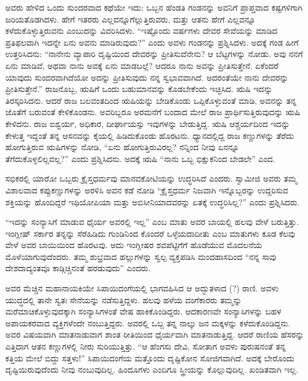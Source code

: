 ಅವರು ಹೇಳಿದ ಒಂದು ಸುಂದರವಾದ ಕಥೆಯೇ ಇದು: ಒಬ್ಬನ ಹೆಂಡತಿ ಗಂಡನನ್ನು ಅವನಿಗೆ ಪ್ರಾಪ್ತವಾದ ಕಷ್ಟಗಳಿಗಾಗಿ ಜರಿಯತೊಡಗಿದಳು. ಹೇಗೆ ಇತರರು ಎಲ್ಲವನ್ನೂ\break ಗೆಲ್ಲುತ್ತಿರುವರು, ಮತ್ತು ಆತನು ಹೇಗೆ ಎಲ್ಲವನ್ನೂ ಕಳೆದುಕೊಳ್ಳುತ್ತಿರುವನು ಎಂಬುದನ್ನು ವಿವರಿಸಿದಳು. “ಇಷ್ಟೊಂದು ವರ್ಷಗಳು ದೇವರ ಸೇವೆಯನ್ನು ಮಾಡಿದ ಪ್ರತಿಫಲವಾಗಿ ಇದನ್ನೇ ಏನು ಅವನು ಮಾಡಿರುವುದು?” ಎಂದು ಅವಳು ಗಂಡನನ್ನು ಪ್ರಶ್ನಿಸಿದಳು. ಅದಕ್ಕೆ ಗಂಡ ಹೀಗೆ ಉತ್ತರಿಸಿದನು: “ನಾನೇನು ವ್ಯಾಪಾರಿ ದೃಷ್ಟಿಯಿಂದ ದೇವರನ್ನು ಪ್ರೀತಿಸುವೆನೇನು? ಆ ಬೆಟ್ಟಗಳನ್ನು ನೋಡು. ಅವು ನನಗೆ ಏನು ಮಾಡಿವೆ, ಅಥವಾ ನಾನು ಅವಕ್ಕೆ ಏನು ಮಾಡಬಲ್ಲೆ? ಆದರೂ ನಾನು ಅವನ್ನು ಪ್ರೀತಿಸುತ್ತೇನೆ. ಏಕೆಂದರೆ ಯಾವುದು ಸುಂದರವಾಗಿದೆಯೋ ಅದನ್ನು ಪ್ರೀತಿಸುವುದು ನನ್ನ ಸ್ವಭಾವವಾಗಿದೆ. ಅದರಂತೆಯೇ ನಾನು ದೇವರನ್ನು ಪ್ರೀತಿಸುತ್ತೇನೆ.” ರಾಜನೊಬ್ಬ, ಋಷಿಗೆ ಒಂದು ಬಹುಮಾನವನ್ನು ಕೊಡಬೇಕೆಂದು ಇಚ್ಛಿಸಿದ. ಋಷಿ ಇದನ್ನು ತಿರಸ್ಕರಿಸಿದನು. ಆದರೆ ರಾಜ ಬಲವಂತದಿಂದ ಋಷಿಯನ್ನು ಬೇಡಿಕೊಂಡು ಒಪ್ಪಿಕೊಳ್ಳುವಂತೆ ಮಾಡಿ, ಅವನನ್ನು ತನ್ನ ಜೊತೆಗೆ ಬರುವಂತೆ ಕೇಳಿಕೊಂಡನು. ಅವರಿಬ್ಬರೂ ಅರಮನೆಗೆ ಬಂದಾದ ಮೇಲೆ ರಾಜ ಪ್ರಾರ್ಥಿಸುತ್ತಿರುವುದನ್ನು ಋಷಿ ಕೇಳಿದನು. ರಾಜ ಐಶ್ವರ್ಯ, ಅಧಿಕಾರ, ದೀರ್ಘಾಯಸ್ಸು ಇವುಗಳನ್ನು ಬೇಡುತ್ತಿದ್ದ. ಋಷಿ ಆಶ್ಚರ್ಯದಿಂದ ಇದನ್ನು ಕೇಳುತ್ತ ಇದ್ದಂತೆ ತನ್ನ ಆಸನವನ್ನು ಕೈಯಲ್ಲಿ ಹಿಡಿದುಕೊಂಡು ಹೊರಟನು. ಧ್ಯಾನದಲ್ಲಿದ್ದ ರಾಜ ಕಣ್ಣುಗಳನ್ನು ತೆರೆದು ಹೋಗುತ್ತಿರುವ ಋಷಿಗಳನ್ನು ನೋಡಿ, “ಏನು ಹೋಗುತ್ತಿರುವಿರಲ್ಲ? ನನ್ನಿಂದ ನೀವು ಏನನ್ನೂ ತೆಗೆದುಕೊಳ್ಳಲಿಲ್ಲವಲ್ಲ?” ಎಂದು ಪ್ರಶ್ನಿಸಿದನು. ಅದಕ್ಕೆ ಋಷಿ “ನಾನು ಒಬ್ಬ ಭಿಕ್ಷುಕನಿಂದ ಬೇಡಲೇ” ಎಂದ.

ಸಭಿಕರಲ್ಲಿ ಯಾರೋ ಒಬ್ಬರು ಕ್ರೈಸ್ತಧರ್ಮವು ಮಾನವಕೋಟಿಯನ್ನು ಉದ್ಧರಿಸಿದೆ ಎಂದರು. ಸ್ವಾಮೀಜಿ ಅವರು ತಮ್ಮ ವಿಶಾಲವಾದ ಕಪ್ಪುಕಣ್ಣುಗಳನ್ನು ಅರಳಿಸಿ ಅವನ ಕಡೆ ನೋಡಿ “ಕ್ರೈಸ್ತಧರ್ಮ ನಿಜವಾಗಿ ಇನ್ನೊಬ್ಬರನ್ನು ಉದ್ದರಿಸುವ ಶಕ್ತಿಯನ್ನು ಹೊಂದಿದ್ದರೆ ಇಥಿಯೋಪಿಯಾ ಮತ್ತು ಅಬಿಸೀನಿಯಾದವರನ್ನು ಏತಕ್ಕೆ ಉದ್ಧರಿಸಿಲ್ಲ?” ಎಂದು ಪ್ರಶ್ನಿಸಿದರು.

“ಇದನ್ನು ಸಂನ್ಯಾಸಿಗೆ ಮಾಡುವ ಧೈರ್ಯ ಅವರಲ್ಲಿ ಇಲ್ಲ” ಎಂಬ ಮಾತು ಅವರ ಬಾಯಲ್ಲಿ ಹಲವು ವೇಳೆ ಬರುತ್ತಿತ್ತು. ಇಂಗ್ಲೀಷ್​ ಸರ್ಕಾರ ತನ್ನನ್ನು ಸೆರೆಹಿಡಿದು ಗುಂಡಿನಿಂದ ಕೊಂದರೆ ಒಳ್ಳೆಯದಾದೀತು ಎಂಬ ಮಾತುಗಳು ಕೂಡ ಕೆಲವು ವೇಳೆ ಅವರ ಬಾಯಿಯಿಂದ ಹೊರಟವು. ಅದು ಇಂಗ್ಲೀಷರ ಶವಪೆಟ್ಟಿಗೆಗೆ ಹೊಡೆಯುವ ಮೊದಲನೆಯ ಮೊಳೆಯಾಗುವುದೆಂದರು. ತಮ್ಮ ಶುಭ್ರವಾದ ಹಲ್ಲುಗಳನ್ನು ಸ್ವಲ್ಪ ವ್ಯಕ್ತಪಡಿಸಿ ಮಂದಹಾಸದಿಂದ “ನನ್ನ ಸಾವು ದೇಶದಾದ್ಯಂತವೂ ಕಾಡ್ಗಿಚ್ಚಿನಂತೆ ಹರಡುವುದು” ಎಂದರು.

ಅವರ ಮೆಚ್ಚಿನ ಮಹಾನಾಯಕಿಯೇ ಸಿಪಾಯಿದಂಗೆಯಲ್ಲಿ ಭಾಗವಹಿಸಿದ ಆ ಅದ್ಭುತಳಾದ (?) ರಾಣಿ. ಅವಳು ಯುದ್ಧದಲ್ಲಿ ತಾನೇ ಸ್ವತಃ ಸೇನೆಯನ್ನು ನಡೆಸುತ್ತಿದ್ದಳು. ಹಲವು ಹಳೆಯ ದಂಗೆಕಾರರು ತಮ್ಮನ್ನು ಮರೆಮಾಚಿಕೊಳ್ಳುವುದಕ್ಕಾಗಿ ಸಂನ್ಯಾಸಿಗಳಂತೆ ವೇಷ ಹಾಕಿಕೊಂಡಿದ್ದರು. ಆದಕಾರಣವೇ ಸಂನ್ಯಾಸಿಗಳನ್ನು ಬಹಳ ಅಪಾಯಕರವಾದ ವ್ಯಕ್ತಿಗಳೆಂದೇ ನಂಬುತ್ತಿದ್ದರು. ಅವರಲ್ಲಿ ಒಬ್ಬ ತನ್ನ ನಾಲ್ಕು ಜನ ಮಕ್ಕಳನ್ನು ಕಳೆದುಕೊಂಡಿ\-ದ್ದನು. ಅವರ ವಿಷಯವಾಗಿ ಮಾತನಾಡುವಾಗ ಶಾಂತ ರೀತಿಯಿಂದ ಧೈರ್ಯವಾಗಿ ಮಾತನಾಡುತ್ತಿದ್ದ. ಆದರೆ ರಾಣಿಯ ಹೆಸರನ್ನು ಎತ್ತಿದಾಗ ಆತನ ಕಣ್ಣುಗಳಲ್ಲಿ ನೀರು ಸುರಿಯುತ್ತಿತ್ತು. “ಆ ಹೆಂಗಸು ದೇವಿ, ಸೋತಾಗ ಅವಳು ಪುರುಷನಂತೆ ತನ್ನ ಕತ್ತಿಯ ಮೇಲೆ ಬಿದ್ದು ಸತ್ತಳು!” ಸಿಪಾಯಿದಂಗೆಯ ಮತ್ತೊಂದು ದೃಷ್ಟಿಕೋನ ಸೋಜಿಗವಾಗಿದೆ. ಅದಕ್ಕೆ ಬೇರೊಂದು ದೃಷ್ಟಿಯಿರುವುದೆಂದು ನೀವು ನಂಬುವುದಿಲ್ಲ. ಹಿಂದೂಗಳು ಎಂದಿಗೂ ಸ್ತ್ರೀಯನ್ನು ಕೊಲ್ಲುವುದಿಲ್ಲ. ಖಂಡಿತವಾಗಿ ಇಲ್ಲ.

\eject

